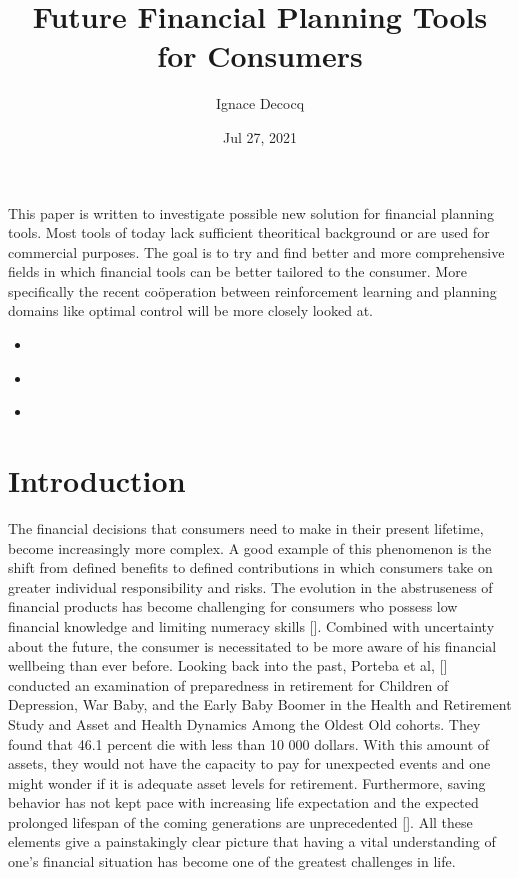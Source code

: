 \documentclass[letterpaper,10pt,english]{jupyterBook}
\title{Future Financial Planning Tools for Consumers}
\date{Jul 27, 2021}
\author{Ignace Decocq}
\begin{document}
\pagestyle{empty}
\sphinxmaketitle
\pagestyle{plain}
\sphinxtableofcontents
\pagestyle{normal}
\label{\detokenize{abstract::doc}}


\sphinxAtStartPar
This paper is  written to investigate possible new solution for financial planning tools. Most tools of today lack sufficient theoritical background or are used for commercial purposes. The goal is to try and find better and more comprehensive fields in which financial tools can be better tailored to the consumer. More specifically the recent coöperation between reinforcement learning and planning domains like optimal control will be more closely looked at.
\begin{itemize}
\item {} 
\sphinxAtStartPar
{\hyperref[\detokenize{Introduction::doc}]{}}

\item {} 
\sphinxAtStartPar
{\hyperref[\detokenize{Reinforcement_learning::doc}]{}}

\item {} 
\sphinxAtStartPar
{\hyperref[\detokenize{Financial_application::doc}]{}}

\end{itemize}


\chapter{Introduction}
\label{\detokenize{Introduction:introduction}}\label{\detokenize{Introduction::doc}}
\sphinxAtStartPar
The financial decisions that consumers need to make in their present lifetime, become increasingly more complex. A good example of this phenomenon is the shift from defined benefits to defined contributions in which consumers take on greater individual responsibility and risks. The evolution in the abstruseness of financial products has become challenging for consumers who possess low financial knowledge and limiting numeracy skills {[}{]}. Combined with uncertainty about the future, the consumer is necessitated to be more aware of his financial well\sphinxhyphen{}being than ever before. Looking back into the past, Porteba et al, {[}{]} conducted an examination of preparedness in retirement for Children of Depression, War Baby, and the Early Baby Boomer in the Health and Retirement Study and Asset and Health Dynamics Among the Oldest Old cohorts. They found that 46.1 percent die with less than 10 000 dollars. With this amount of assets, they would not have the capacity to pay for unexpected events and one might wonder if it is adequate asset levels for retirement. Furthermore, saving behavior has not kept pace with increasing life expectation and the expected prolonged lifespan of the coming generations are unprecedented {[}{]}. All these elements give a painstakingly clear picture that having a vital understanding of one’s financial situation has become one of the greatest challenges in life.
\end{document}
